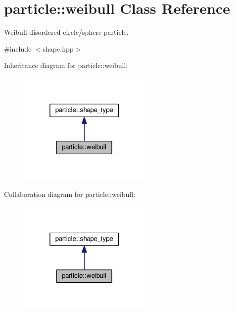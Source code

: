 \hypertarget{classparticle_1_1weibull}{}\section{particle\+:\+:weibull Class Reference}
\label{classparticle_1_1weibull}


Weibull disordered circle/sphere particle.  




{\ttfamily \#include $<$shape.\+hpp$>$}



Inheritance diagram for particle\+:\+:weibull\+:
\nopagebreak
\begin{figure}[H]
\begin{center}
\leavevmode
\includegraphics[width=184pt]{de/d9c/classparticle_1_1weibull__inherit__graph}
\end{center}
\end{figure}


Collaboration diagram for particle\+:\+:weibull\+:
\nopagebreak
\begin{figure}[H]
\begin{center}
\leavevmode
\includegraphics[width=184pt]{d5/d73/classparticle_1_1weibull__coll__graph}
\end{center}
\end{figure}

